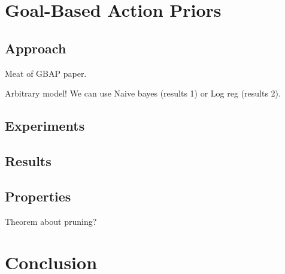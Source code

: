 \documentclass[11pt]{article}
\begin{document}
\section{Goal-Based Action Priors}

\subsection{Approach}
Meat of GBAP paper.

Arbitrary model! We can use Naive bayes (results 1) or Log reg (results 2).

\subsection{Experiments}

\subsection{Results}

\subsection{Properties}
Theorem about pruning?

\section{Conclusion}



\end{document}
